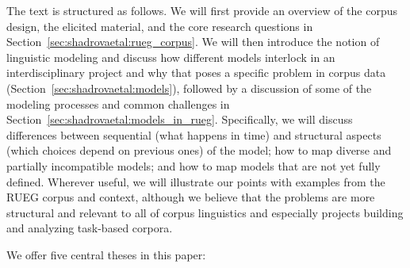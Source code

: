 \documentclass[output=paper,colorlinks,citecolor=brown]{langscibook}
\begin{document}
The text is structured as follows. We will first provide an overview of the corpus design, the elicited material, and the core research questions in Section~\ref{sec:shadrovaetal:rueg_corpus}. We will then introduce the notion of linguistic modeling and discuss how different models interlock in an interdisciplinary project and why that poses a specific problem in corpus data (Section~\ref{sec:shadrovaetal:models}), followed by a discussion of some of the modeling processes and common challenges in Section~\ref{sec:shadrovaetal:models_in_rueg}. Specifically, we will discuss differences between sequential (what happens in time) and structural aspects (which choices depend on previous ones) of the model; how to map diverse and partially incompatible models; and how to map models that are not yet fully defined. Wherever useful, we will illustrate our points with examples from the RUEG corpus and context, although we believe that the problems are more structural and relevant to all of corpus linguistics and especially projects building and analyzing task-based corpora.

We offer five central theses in this paper:
\end{document}
